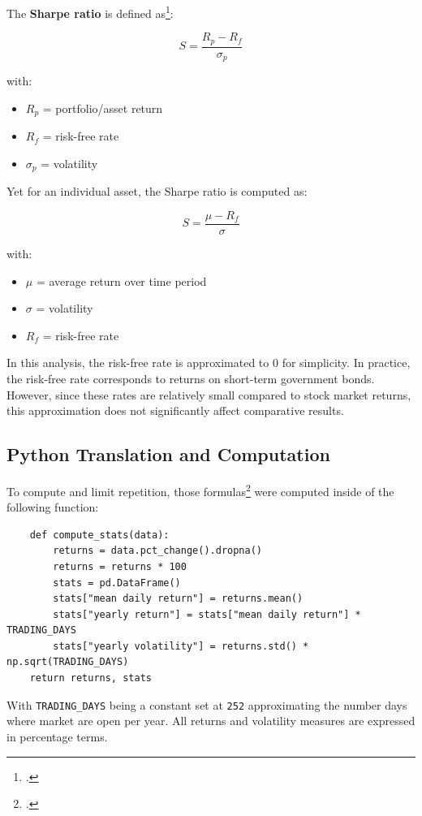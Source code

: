 \documentclass{article}
\begin{document}
\pagebreak

The \textbf{Sharpe ratio} is defined as\footcite{HommUlrich2012BtSr}:

$$ S= \frac{R_p - R_f}{\sigma_p}$$

with:
\begin{itemize}
    \item $R_p$ = portfolio/asset return
    \item $R_f$ = risk-free rate
    \item $\sigma_p$ = volatility 
\end{itemize}

Yet for an individual asset, the Sharpe ratio is computed as:

$$
S = \frac{\mu - R_f}{\sigma}
$$

with: 
\begin{itemize}
    \item $\mu$ = average return over time period
    \item $\sigma$ = volatility
    \item $R_f$ = risk-free rate
\end{itemize}

In this analysis, the risk-free rate is approximated to 0 for simplicity. In practice, the risk-free rate corresponds to returns on short-term government bonds.
However, since these rates are relatively small compared to stock market returns, this approximation does not significantly affect comparative results.

\vspace{0.3cm}
\subsection{Python Translation and Computation}
To compute and limit repetition, those formulas\footcite{numpy} were computed inside of the following function: 

\begin{lstlisting}
    def compute_stats(data):
        returns = data.pct_change().dropna() 
        returns = returns * 100
        stats = pd.DataFrame()
        stats["mean daily return"] = returns.mean()
        stats["yearly return"] = stats["mean daily return"] * TRADING_DAYS
        stats["yearly volatility"] = returns.std() * np.sqrt(TRADING_DAYS)
    return returns, stats
\end{lstlisting}

With \texttt{TRADING\_DAYS} being a constant set at \texttt{252} approximating the number days where market are open per year.
\vspace{0.3cm}
All returns and volatility measures are expressed in percentage terms.
\pagebreak
\end{document}
